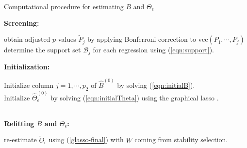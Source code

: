 
\begin{algorithm}[t]
\caption{Computational procedure for estimating $B$ and $\Theta_\epsilon$}\label{alg:as}

\BlankLine
\textbf{Screening:}\\
\hspace*{5mm}\begin{minipage}[t]{14.5cm}
 obtain adjusted $p$-values $\widetilde{P}_j$ by applying Bonferroni correction to  $\mathrm{vec}(P_1,\cdots,P_j)$\;
 determine the support set $\mathcal{B}_j$ for each regression using (\ref{eqn:support}).
\end{minipage}
\BlankLine
\textbf{Initialization:}\\
\hspace*{5mm}\begin{minipage}[t]{14.5cm}
Initialize column $j=1,\cdots,p_2$ of $\widehat{B}^{(0)}$ by solving (\ref{eqn:initialB}).\\
Initialize $\widehat{\Theta}_\epsilon^{(0)}$ by solving (\ref{eqn:initialTheta}) using the graphical lasso \citep{friedman2008sparse}.
\end{minipage}\\
\BlankLine
\textbf{Refitting $B$ and $\Theta_\epsilon$:}
\hspace*{5mm}\begin{minipage}[t]{14.5cm}
 re-estimate $\widetilde{\Theta}_\epsilon$ using (\ref{glasso-final}) with $W$ coming from stability selection.
\end{minipage} 
\BlankLine
{}
\end{algorithm}
